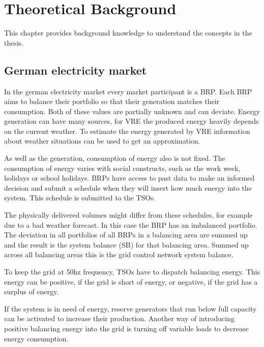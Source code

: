 \documentclass[class=scrbook, crop=false]{standalone}
\begin{document}


\chapter{Theoretical Background}
\label{Chapter::Theoretical_Background} %
This chapter provides background knowledge to understand the concepts in the thesis.

\section{German electricity market}
\label{Section::German_Electricity_Market}

In the german electricity market every market participant is a BRP. Each BRP aims to balance their portfolio so that their generation matches their consumption. Both of these values are partially unknown and can deviate. 
Energy generation can have many sources, for VRE the produced energy heavily depends on the current weather.
To estimate the energy generated by VRE information about weather situations can be used to get an approximation. 

As well as the generation, consumption of energy also is not fixed. The consumption of energy varies with social constructs, such as the work week, holidays or school holidays. 
BRPs have access to past data to make an informed decision and submit a schedule when they will insert how much energy into the system.
This schedule is submitted to the TSOs.

The physically delivered volumes might differ from these schedules, for example due to a bad weather forecast. In this case the BRP has an imbalanced portfolio.
The deviation in all portfolios of all BRPs in a balancing area are summed up and the result is the system balance (SB) for that balancing area. Summed up across all balancing areas this is the grid control network system balance.

To keep the grid at 50hz frequency, TSOs have to dispatch balancing energy. 
This energy can be positive, if the grid is short of energy, or negative, if the grid has a surplus of energy. 

If the system is in need of energy, reserve generators that run below full capacity can be activated to increase their production. Another way of introducing positive balancing energy into the grid is turning off variable loads to decrease energy consumption.
\end{document}

